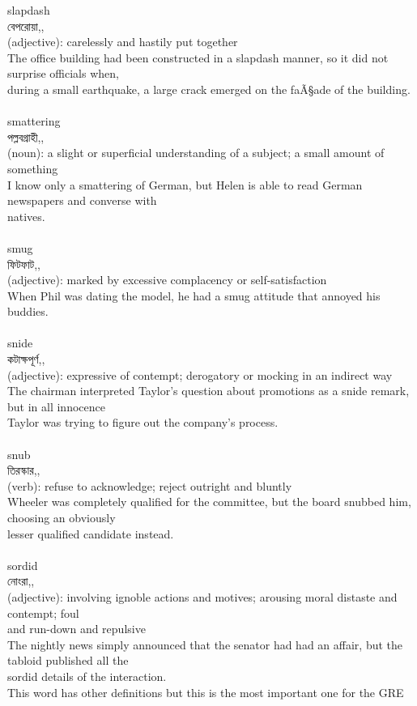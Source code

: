 \documentclass{article}
\begin{document}
{slapdash}\\
{বেপরোয়া,,}\\
{(adjective): carelessly and hastily put together\\The office building had been constructed in a slapdash manner, so it did not surprise officials when,\\during a small earthquake, a large crack emerged on the faÃ§ade of the building.\\}\\
{smattering}\\
{পল্লবগ্রাহী,,}\\
{(noun): a slight or superficial understanding of a subject; a small amount of something\\I know only a smattering of German, but Helen is able to read German newspapers and converse with\\natives.\\}\\
{smug}\\
{ফিটফাট,,}\\
{(adjective): marked by excessive complacency or self-satisfaction\\When Phil was dating the model, he had a smug attitude that annoyed his buddies.\\}\\
{snide}\\
{কটাক্ষপূর্ণ,,}\\
{(adjective): expressive of contempt; derogatory or mocking in an indirect way\\The chairman interpreted Taylor's question about promotions as a snide remark, but in all innocence\\Taylor was trying to figure out the company's process.\\}\\
{snub}\\
{তিরস্কার,,}\\
{(verb): refuse to acknowledge; reject outright and bluntly\\Wheeler was completely qualified for the committee, but the board snubbed him, choosing an obviously\\lesser qualified candidate instead.\\}\\
{sordid}\\
{নোংরা,,}\\
{(adjective): involving ignoble actions and motives; arousing moral distaste and contempt; foul\\and run-down and repulsive\\The nightly news simply announced that the senator had had an affair, but the tabloid published all the\\sordid details of the interaction.\\This word has other definitions but this is the most important one for the GRE\\}\\
\end{document}
